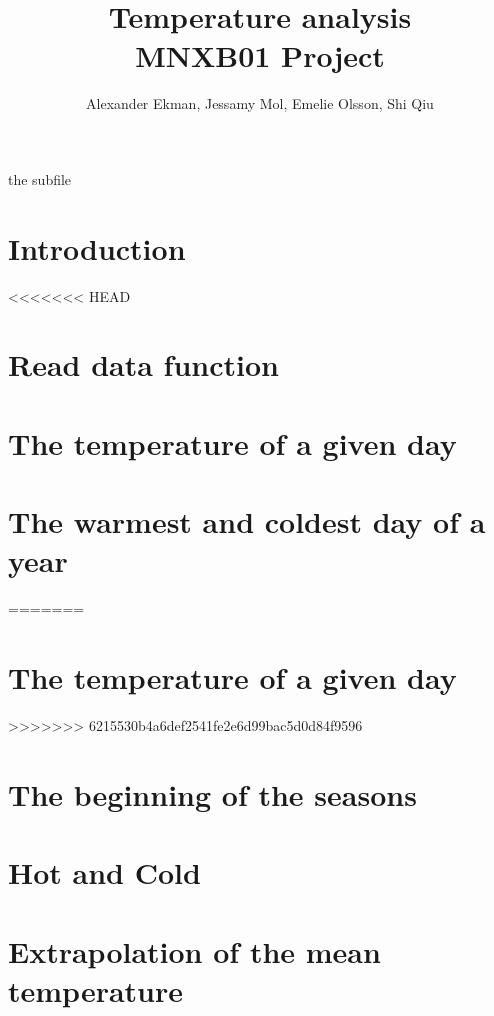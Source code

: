 \documentclass[a4paper]{article}
\title{\textbf{Temperature analysis } \\ 
\vspace{5pt}
\large MNXB01 Project}
\author{Alexander Ekman, Jessamy Mol, Emelie Olsson, Shi Qiu}
\date{ }
\begin{document}
 
 
 
the subfile

\maketitle

\vspace{-24pt}
\section{Introduction}
 


<<<<<<< HEAD
\section{Read data function}


\section{The temperature of a given day}


\section{The warmest and coldest day of a year}

=======
\section{The temperature of a given day}

>>>>>>> 6215530b4a6def2541fe2e6d99bac5d0d84f9596

\section{The beginning of the seasons}


\section{Hot and Cold}


\section{Extrapolation of the mean temperature}


\newpage


 
\end{document}
